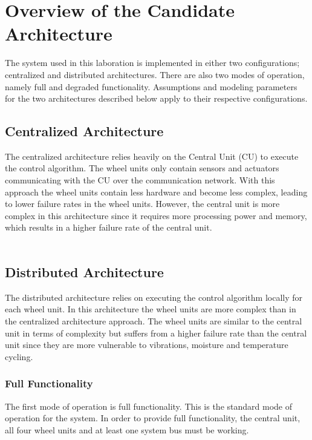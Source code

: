 
\newpage
\section{Overview of the Candidate Architecture}
The system used in this laboration is implemented in either two configurations; centralized and distributed architectures. There are also two modes of operation, namely full and degraded functionality. Assumptions and modeling parameters for the two architectures described below apply to their respective configurations. 

\subsection{Centralized Architecture}
The centralized architecture relies heavily on the Central Unit (CU) to execute the control algorithm. The wheel units only contain sensors and actuators communicating with the CU over the communication network. With this approach the wheel units contain less hardware and become less complex, leading to lower failure rates in the wheel units. However, the central unit is more complex in this architecture since it requires more processing power and memory, which results in a higher failure rate of the central unit.\\
\\
\subsection{Distributed Architecture}
The distributed architecture relies on executing the control algorithm locally for each wheel unit. In this architecture the wheel units are more complex than in the centralized architecture approach. The wheel units are similar to the central unit in terms of complexity but suffers from a higher failure rate than the central unit since they are more vulnerable to vibrations, moisture and temperature cycling. 
\subsubsection{Full Functionality}
The first mode of operation is full functionality. This is the standard mode of operation for the system. In order to provide full functionality, the central unit, all four wheel units and at least one system bus must be working.
